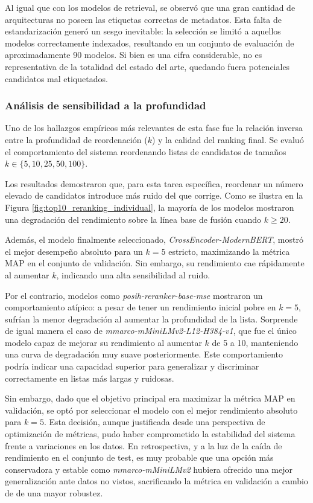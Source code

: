 Al igual que con los modelos de retrieval, se observó que una gran cantidad de arquitecturas no poseen las etiquetas correctas de metadatos. Esta falta de estandarización generó un sesgo inevitable: la selección se limitó a aquellos modelos correctamente indexados, resultando en un conjunto de evaluación de aproximadamente 90 modelos. Si bien es una cifra considerable, no es representativa de la totalidad del estado del arte, quedando fuera potenciales candidatos mal etiquetados.

\subsubsection{Análisis de sensibilidad a la profundidad}
\noindent Uno de los hallazgos empíricos más relevantes de esta fase fue la relación inversa entre la profundidad de reordenación ($k$) y la calidad del ranking final. Se evaluó el comportamiento del sistema reordenando listas de candidatos de tamaños $k \in \{5, 10, 25, 50, 100\}$.

Los resultados demostraron que, para esta tarea específica, reordenar un número elevado de candidatos introduce más ruido del que corrige. Como se ilustra en la Figura \ref{fig:top10_reranking_individual}, la mayoría de los modelos mostraron una degradación del rendimiento sobre la línea base de fusión cuando $k \ge 20$. 

Además, el modelo finalmente seleccionado, \textit{CrossEncoder-ModernBERT}, mostró el mejor desempeño absoluto para un $k=5$ estricto, maximizando la métrica \gls{MAP} en el conjunto de validación. Sin embargo, su rendimiento cae rápidamente al aumentar $k$, indicando una alta sensibilidad al ruido. 

Por el contrario, modelos como \textit{posih-reranker-base-mse} mostraron un comportamiento atípico: a pesar de tener un rendimiento inicial pobre en $k=5$, sufrían la menor degradación al aumentar la profundidad de la lista. Sorprende de igual manera el caso de \textit{mmarco-mMiniLMv2-L12-H384-v1}, que fue el único modelo capaz de mejorar su rendimiento al aumentar $k$ de 5 a 10, manteniendo una curva de degradación muy suave posteriormente. Este comportamiento podría indicar una capacidad superior para generalizar y discriminar correctamente en listas más largas y ruidosas.

Sin embargo, dado que el objetivo principal era maximizar la métrica \gls{MAP} en validación, se optó por seleccionar el modelo con el mejor rendimiento absoluto para $k=5$. Esta decisión, aunque justificada desde una perspectiva de optimización de métricas, pudo haber comprometido la estabilidad del sistema frente a variaciones en los datos. En retrospectiva, y a la luz de la caída de rendimiento en el conjunto de test, es muy probable que una opción más conservadora y estable como \textit{mmarco-mMiniLMv2} hubiera ofrecido una mejor generalización ante datos no vistos, sacrificando la métrica en validación a cambio de de una mayor robustez.

